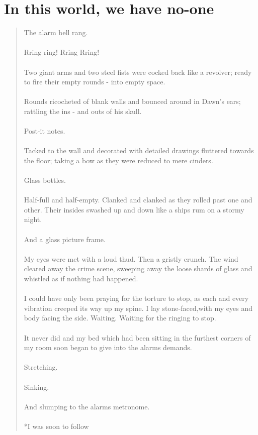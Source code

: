 \documentclass{book}
\begin{document}
\chapter{In this world, we have no-one}
\begin{quote}
The alarm bell rang.\\\\
Rring ring! Rring Rring!\\\\
Two giant arms and two steel fists were cocked back like a revolver; ready to fire their empty rounds - into empty space.\\\\
Rounds ricocheted of blank walls and bounced around in Dawn's ears; rattling the ins - and outs of his skull.\\\\
Post-it notes.\\\\ Tacked to the wall and decorated with detailed drawings fluttered towards the floor; taking a bow as they were reduced to mere cinders.\\\\ Glass bottles.\\\\
Half-full and half-empty. Clanked and clanked as they rolled  past one and other. Their insides swashed up and down like a ships rum on a stormy night.\\\\
And a glass picture frame.\\\\
My eyes were met with a loud thud. Then a gristly crunch. The wind cleared away the crime scene, sweeping away the loose shards of glass and whistled as if nothing had happened.\\\\
I could have only been praying for the torture to stop, as each and every vibration creeped its way up my spine. I lay stone-faced,with my eyes and body facing the side. Waiting. Waiting for the ringing to stop.\\\\
It never did and my bed which had been sitting in the furthest corners of my room soon began to give into the alarms demands.\\\\
Stretching.\\\\
Sinking.\\\\ And slumping to the alarms metronome.
\\\\ *I was soon to follow
 \end{quote}
\end{document}
